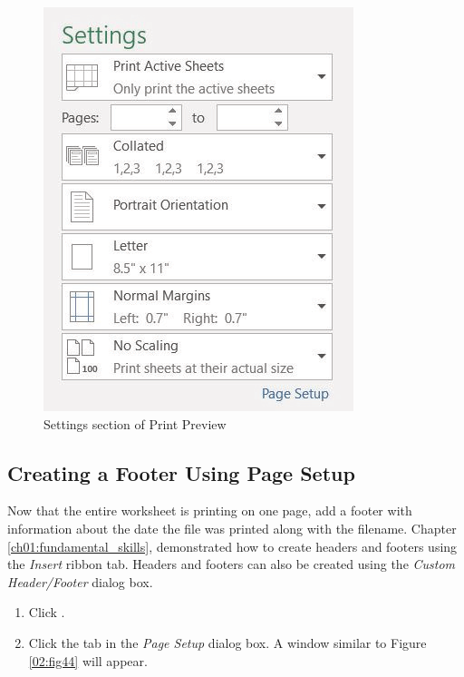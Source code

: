 \begin{figure}[H]
	\centering
	\includegraphics[width=\maxwidth{.95\linewidth}]{gfx/ch02_fig43}
	\caption{Settings section of Print Preview}
	\label{02:fig43}
\end{figure}

\subsection{Creating a Footer Using Page Setup}

Now that the entire worksheet is printing on one page, add a footer with information about the date the file was printed along with the filename. Chapter \ref{ch01:fundamental_skills},  demonstrated how to create headers and footers using the \textit{Insert} ribbon tab. Headers and footers can also be created using the \textit{Custom Header/Footer} dialog box.

\begin{enumerate}
	\item Click . 
	\item Click the  tab in the \textit{Page Setup} dialog box. A window similar to Figure \ref{02:fig44} will appear.
\end{enumerate}

